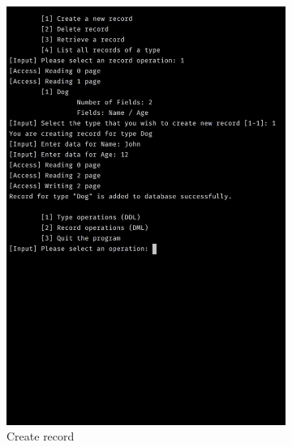 \documentclass[12pt,a4paper]{article}
\begin{document}
\begin{figure}
\centering
\begin{subfigure}{.5\textwidth}
  \centering
  \includegraphics[width=.90\linewidth]{ss3.jpg}
  \caption{Create record}
  \label{fig:sub3}
\end{subfigure}%
\begin{subfigure}{.5\textwidth}
  \centering

\end{subfigure}
\end{figure}
\end{document}
